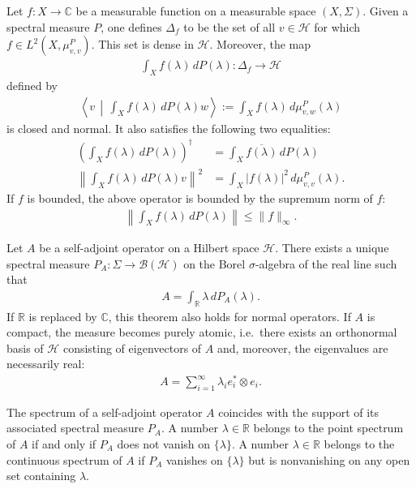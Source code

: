     \begin{property}
        Let $f:X\rightarrow\mathbb{C}$ be a measurable function on a measurable space $(X,\Sigma)$. Given a spectral measure $P$, one defines $\Delta_f$ to be the set of all $v\in\mathcal{H}$ for which $f\in L^2(X,\mu^P_{v,v})$. This set is dense in $\mathcal{H}$. Moreover, the map
        \begin{gather}
            \int_Xf(\lambda)\,dP(\lambda):\Delta_f\rightarrow\mathcal{H}
        \end{gather}
        defined by
        \begin{gather}
            \left\langle v\,\middle|\,\int_Xf(\lambda)\,dP(\lambda)w\right\rangle := \int_Xf(\lambda)\,d\mu^P_{v,w}(\lambda)
        \end{gather}
        is closed and normal. It also satisfies the following two equalities:
        \begin{align}
            \left(\int_Xf(\lambda)\,dP(\lambda)\right)^\dag &= \int_X\overline{f(\lambda)}\,dP(\lambda)\\
            \left\|\int_Xf(\lambda)\,dP(\lambda)v\right\|^2 &= \int_X|f(\lambda)|^2\,d\mu^P_{v,v}(\lambda).
        \end{align}
        If $f$ is bounded, the above operator is bounded by the supremum norm of $f$:
        \begin{gather}
            \left\|\int_Xf(\lambda)\,dP(\lambda)\right\|\leq\|f\|_\infty.
        \end{gather}
    \end{property}

    \begin{theorem}
        Let $A$ be a self-adjoint operator on a Hilbert space $\mathcal{H}$. There exists a unique spectral measure $P_A:\Sigma\rightarrow\mathcal{B}(\mathcal{H})$ on the Borel $\sigma$-algebra of the real line such that
        \begin{gather}
            A = \int_\mathbb{R}\lambda\,dP_A(\lambda).
        \end{gather}
        If $\mathbb{R}$ is replaced by $\mathbb{C}$, this theorem also holds for normal operators. If $A$ is compact, the measure becomes purely atomic, i.e.~there exists an orthonormal basis of $\mathcal{H}$ consisting of eigenvectors of $A$ and, moreover, the eigenvalues are necessarily real:
        \begin{gather}
            A = \sum_{i=1}^\infty\lambda_ie_i^*\otimes e_i.
        \end{gather}
    \end{theorem}
    \begin{property}
        The spectrum of a self-adjoint operator $A$ coincides with the support of its associated spectral measure $P_A$. A number $\lambda\in\mathbb{R}$ belongs to the point spectrum of $A$ if and only if $P_A$ does not vanish on $\{\lambda\}$. A number $\lambda\in\mathbb{R}$ belongs to the continuous spectrum of $A$ if $P_A$ vanishes on $\{\lambda\}$ but is nonvanishing on any open set containing $\lambda$.
    \end{property}

